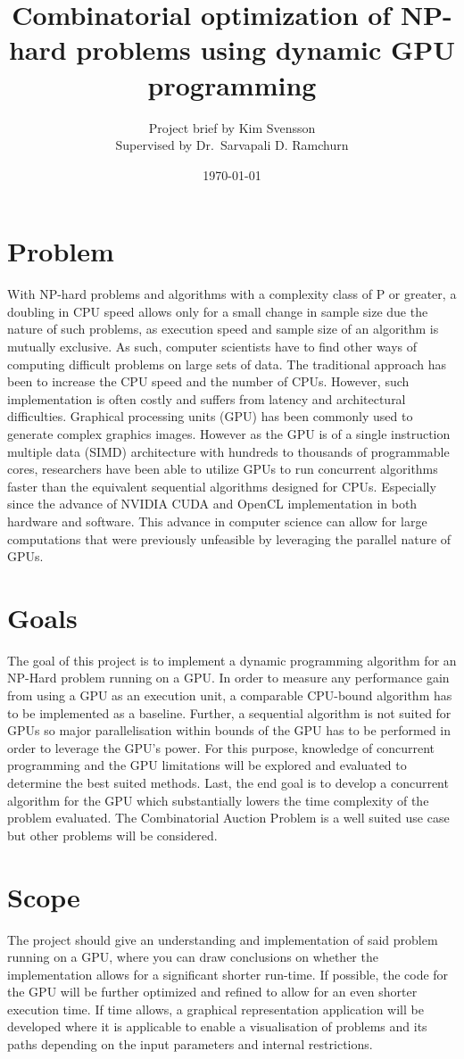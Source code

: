 \documentclass[a4paper, 12pt]{article}
\title{Combinatorial optimization of NP-hard problems using dynamic GPU programming}
\author{Project brief by Kim Svensson \\ \small{Supervised by Dr.\ Sarvapali D. Ramchurn}}
\date{\today}
\begin{document}
\maketitle
{}%
\section{Problem}
With NP-hard problems and algorithms with a complexity class of P or greater, a doubling in CPU speed allows only for a small change in sample size due the nature of such problems, as execution speed and sample size of an algorithm is mutually exclusive.
As such, computer scientists have to find other ways of computing difficult problems on large sets of data.
The traditional approach has been to increase the CPU speed and the number of CPUs.
However, such implementation is often costly and suffers from latency and architectural difficulties.
Graphical processing units (GPU) has been commonly used to generate complex graphics images.
However as the GPU is of a single instruction multiple data (SIMD) architecture with hundreds to thousands of programmable cores,
researchers have been able to utilize GPUs to run concurrent algorithms faster than the equivalent sequential algorithms designed for CPUs. Especially since the advance of NVIDIA CUDA and OpenCL implementation in both hardware and software.
This advance in computer science can allow for large computations that were previously unfeasible by leveraging the parallel nature of GPUs.


\section{Goals}
The goal of this project is to implement a dynamic programming algorithm for an NP-Hard problem running on a GPU.
In order to measure any performance gain from using a GPU as an execution unit, a comparable CPU-bound algorithm has to be implemented as a baseline.
Further, a sequential algorithm is not suited for GPUs so major parallelisation within bounds of the GPU has to be performed in order to leverage the GPU's power.
For this purpose, knowledge of concurrent programming and the GPU limitations will be explored and evaluated to determine the best suited methods.
Last, the end goal is to develop a concurrent algorithm for the GPU which substantially lowers the time complexity of the problem evaluated. The Combinatorial Auction Problem is a well suited use case but other problems will be considered.

\section{Scope}
The project should give an understanding and implementation of said problem running on a GPU, where you can draw conclusions on whether the implementation allows for a significant shorter run-time.
If possible, the code for the GPU will be further optimized and refined to allow for an even shorter execution time.
If time allows, a graphical representation application will be developed where it is applicable to enable a visualisation of problems and its paths depending on the input parameters and internal restrictions.
\end{document}
